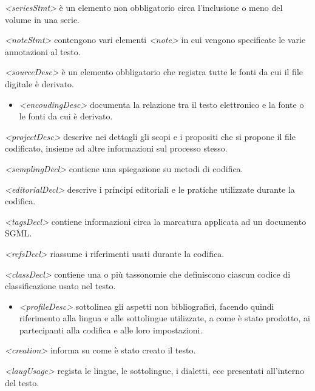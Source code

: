 \documentclass[
  b5paper,
  twoside,
  12pt,
  chapterprefix=false,
  bibliography=totocnumbered,
  parskip=false]{scrbook}
\providecommand{\tightlist}{%
  \setlength{\itemsep}{0pt}\setlength{\parskip}{0pt}}
\begin{document}
\emph{\textless seriesStmt\textgreater{}} è un elemento non obbligatorio circa l'inclusione o
meno del volume in una serie.

\emph{\textless noteStmt\textgreater{}} contengono vari elementi \emph{\textless note\textgreater{}} in cui vengono
specificate le varie annotazioni al testo.

\emph{\textless sourceDesc\textgreater{}} è un elemento obbligatorio che registra tutte le fonti
da cui il file digitale è derivato.

\begin{itemize}
\tightlist
\item
  \emph{\textless encoudingDesc\textgreater{}} documenta la relazione tra il testo elettronico
  e la fonte o le fonti da cui è derivato.
\end{itemize}

\emph{\textless projectDesc\textgreater{}} descrive nei dettagli gli scopi e i propositi che si
propone il file codificato, insieme ad altre informazioni sul processo
stesso.

\emph{\textless semplingDecl\textgreater{}} contiene una spiegazione su metodi di codifica.

\emph{\textless editorialDecl\textgreater{}} descrive i principi editoriali e le pratiche
utilizzate durante la codifica.

\emph{\textless tagsDecl\textgreater{}} contiene informazioni circa la marcatura applicata ad un
documento SGML.

\emph{\textless refsDecl\textgreater{}} riassume i riferimenti usati durante la codifica.

\emph{\textless classDecl\textgreater{}} contiene una o più tassonomie che definiscono ciascun
codice di classificazione usato nel testo.

\begin{itemize}
\tightlist
\item
  \emph{\textless profileDesc\textgreater{}} sottolinea gli aspetti non bibliografici, facendo
  quindi riferimento alla lingua e alle sottolingue utilizzate, a come
  è stato prodotto, ai partecipanti alla codifica e alle loro
  impostazioni.
\end{itemize}

\emph{\textless creation\textgreater{}} informa su come è stato creato il testo.

\emph{\textless laugUsage\textgreater{}} regista le lingue, le sottolingue, i dialetti, ecc
presentati all'interno del testo.
\end{document}
